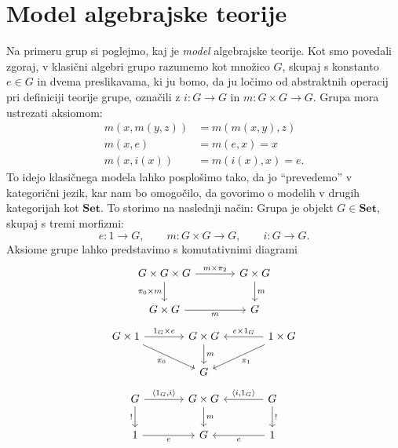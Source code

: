\documentclass[../kategoricna_logika.tex]{subfiles}
\begin{document}
\section{Model algebrajske teorije}
Na primeru grup si poglejmo, kaj je \emph{model} algebrajske teorije.
Kot smo povedali zgoraj, v klasični algebri grupo razumemo kot množico $G$,
skupaj s konstanto $e \in G$ in dvema preslikavama,
ki ju bomo, da ju ločimo od abstraktnih operacij pri definiciji teorije
grupe, označili z $i : G \to G$ in $m : G \times G \to G$.
Grupa mora ustrezati aksiomom:
\begin{align*}
   m(x,m(y,z)) &= m(m(x,y),z) \\
   m(x,e) &= m(e,x) = x \\
   m(x,i(x)) &= m(i(x),x) = e.
\end{align*}
%
To idejo klasičnega modela lahko posplošimo tako, da jo "`prevedemo"' v
kategorični jezik, kar nam bo omogočilo, da govorimo o modelih v drugih
kategorijah kot $\mathbf{Set}$. To storimo na naslednji način:
Grupa je objekt $G \in \mathbf{Set}$, skupaj s tremi morfizmi:
\[ e : 1 \to G, \qquad m : G \times G \to G, \qquad i : G \to G. \]
Aksiome grupe lahko predstavimo s komutativnimi diagrami
\begin{equation}\label{diagram:asociativnost}
  \begin{tikzcd}[column sep = large]
    G \times G \times G \ar[d, "\pi_0 \times m"'] \ar[r, "m \times \pi_2"] & G \times G \ar[d, "m"] \\
    G \times G \ar[r, "m"'] & G
  \end{tikzcd}
\end{equation}
\begin{equation}\label{diagram:enota}
  \begin{tikzcd}[column sep = large]
    G \times 1 \ar[dr, "\pi_0"'] \ar[r, "1_G \times e"] & G \times G \ar[d, "m"] & 1 \times G \ar[l, "e \times 1_G"'] \ar[dl, "\pi_1"] \\
    & G
  \end{tikzcd}
\end{equation}
\begin{equation}\label{diagram:inverz}
  \begin{tikzcd}[column sep = large]
    G \ar[d, "!"'] \ar[r, "{\langle 1_G, i \rangle}"] & G \times G \ar[d, "m"] & G \ar[l, "{\langle i, 1_G \rangle}"'] \ar[d, "!"] \\
    1 \ar[r, "e"'] & G & 1 \ar[l, "e"]
  \end{tikzcd}
\end{equation}
\end{document}
